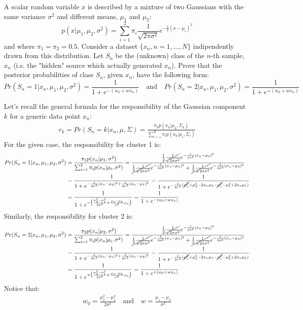 \Exercise[number={14}]
A scalar random variable \(x\) is described by a mixture of two Gaussians with the
same variance \(\sigma^2\) and different means, \(\mu_1\) and \(\mu_2\):
\[
    p(x|\mu_1,\mu_2,\sigma^2)=\sum_{i=1}^2\pi_i\frac{1}{\sqrt{2\pi\sigma^2}}e^{-\frac{1}{2}(x-\mu_i)^2}
\]
and where \(\pi_1=\pi_2=0.5\). Consider a dataset \(\{x_n,n=1,...,N\}\) indipendently
drawn from this distribution. Let \(S_n\) be the (unknown) class of the \(n\)-th
sample, \(x_n\) (i.e. the "hidden" source which actually generated \(x_n\)).
Prove that the posterior probabilities of class \(S_n\), given \(x_n\), have the
following form:
\[
    Pr(S_n=1|x_n,\mu_1,\mu_2,\sigma^2)=\frac{1}{1+e^{-(w_0+wx_n)}}
    \quad\text{and}\quad
    Pr(S_n=2|x_n,\mu_1,\mu_2,\sigma^2)=\frac{1}{1+e^{+(w_0+wx_n)}}
\]

\Answer[number={14}]
Let's recall the general formula for the responsibility of the Gaussian component
\(k\) for a generic data point \(x_n\):
\begin{align*}
    r_k=Pr(S_n=k|x_n,\mu,\Sigma)
    =\frac{\pi_k p(x_n|\mu_k,\Sigma_k)}{\sum_{i=1}^K\pi_i p(x_n|\mu_i,\Sigma_i)}
\end{align*}
For the given case, the responsibility for cluster 1 is:
\begin{align*}
    Pr(S_n=1|x_n,\mu_1,\mu_2,\sigma^2)
    &=\frac{\pi_1 p(x_n|\mu_1,\sigma^2)}{\sum_{i=1}^2\pi_i p(x_n|\mu_i,\sigma^2)}
    =\frac{\cancel{\frac{1}{2}\frac{1}{\sqrt{2\pi\sigma^2}}}e^{-\frac{1}{2\sigma^2}(x_n-\mu_1)^2}}{\cancel{\frac{1}{2}\frac{1}{\sqrt{2\pi\sigma^2}}}e^{-\frac{1}{2\sigma^2}(x_n-\mu_1)^2}+\cancel{\frac{1}{2}\frac{1}{\sqrt{2\pi\sigma^2}}}e^{-\frac{1}{2\sigma^2}(x_n-\mu_2)^2}}\\
    &=\frac{1}{1+e^{-\frac{1}{2\sigma^2}(x_n-\mu_2)^2+\frac{1}{2\sigma^2}(x_n-\mu_1)^2}}
    =\frac{1}{1+e^{-\frac{1}{2\sigma^2}(\cancel{x_n^2}+\mu_2^2-2x_n\mu_2-\cancel{x_n^2}-\mu_1^2+2x_n\mu_1)}}\\
    &=\frac{1}{1+e^{-\bigl(\frac{\mu_2^2-\mu_1^2}{2\sigma^2}+\frac{\mu_1-\mu_2}{\sigma^2}x_n\bigr)}}
    =\frac{1}{1+e^{-(w_0+wx_n)}}
\end{align*}
Similarly, the responsibility for cluster 2 is:
\begin{align*}
    Pr(S_n=2|x_n,\mu_1,\mu_2,\sigma^2)
    &=\frac{\pi_2 p(x_n|\mu_2,\sigma^2)}{\sum_{i=1}^2\pi_i p(x_n|\mu_i,\sigma^2)}
    =\frac{\cancel{\frac{1}{2}\frac{1}{\sqrt{2\pi\sigma^2}}}e^{-\frac{1}{2\sigma^2}(x_n-\mu_2)^2}}{\cancel{\frac{1}{2}\frac{1}{\sqrt{2\pi\sigma^2}}}e^{-\frac{1}{2\sigma^2}(x_n-\mu_1)^2}+\cancel{\frac{1}{2}\frac{1}{\sqrt{2\pi\sigma^2}}}e^{-\frac{1}{2\sigma^2}(x_n-\mu_2)^2}}\\
    &=\frac{1}{1+e^{-\frac{1}{2\sigma^2}(x_n-\mu_1)^2+\frac{1}{2\sigma^2}(x_n-\mu_2)^2}}
    =\frac{1}{1+e^{-\frac{1}{2\sigma^2}(\cancel{x_n^2}+\mu_1^2-2x_n\mu_1-\cancel{x_n^2}-\mu_2^2+2x_n\mu_2)}}\\
    &=\frac{1}{1+e^{+\bigl(\frac{\mu_2^2-\mu_1^2}{2\sigma^2}+\frac{\mu_1-\mu_2}{\sigma^2}x_n\bigr)}}
    =\frac{1}{1+e^{+(w_0+wx_n)}}
\end{align*}
Notice that:
\begin{align*}
    w_0=\frac{\mu_2^2-\mu_1^2}{2\sigma^2}
    \quad\text{and}\quad
    w=\frac{\mu_1-\mu_2}{\sigma^2}
\end{align*}